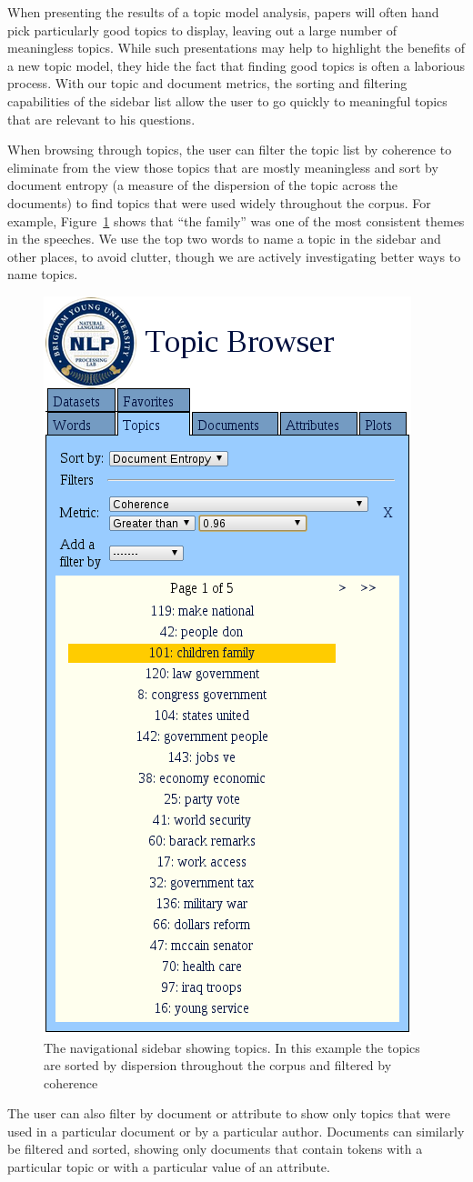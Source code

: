 \documentclass{article}
\begin{document}
When presenting the results of a topic model analysis, papers will often hand
pick particularly good topics to display, leaving out a large number of
meaningless topics.  While such presentations may help to highlight the
benefits of a new topic model, they hide the fact that finding good topics is
often a laborious process.  With our topic and document metrics, the sorting
and filtering capabilities of the sidebar list allow the user to go quickly to
meaningful topics that are relevant to his questions.

When browsing through topics, the user can filter the topic list by coherence
to eliminate from the view those topics that are mostly meaningless and sort by
document entropy (a measure of the dispersion of the topic across the
documents) to find topics that were used widely throughout the corpus.  For
example, Figure~\ref{fig:sidebar} shows that ``the family'' was one of the most
consistent themes in the speeches.  We use the top two words to name a topic in
the sidebar and other places, to avoid clutter, though we are actively
investigating better ways to name topics.

\begin{figure}
  \centering
  \includegraphics[width=.34\textwidth]{sidebar}
  \caption{The navigational sidebar showing topics.  In this example the topics
  are sorted by dispersion throughout the corpus and filtered by coherence}
  \label{fig:sidebar}
\end{figure}

The user can also filter by document or attribute to show only topics that were
used in a particular document or by a particular author.  Documents can
similarly be filtered and sorted, showing only documents that contain tokens
with a particular topic or with a particular value of an attribute.
\end{document}
